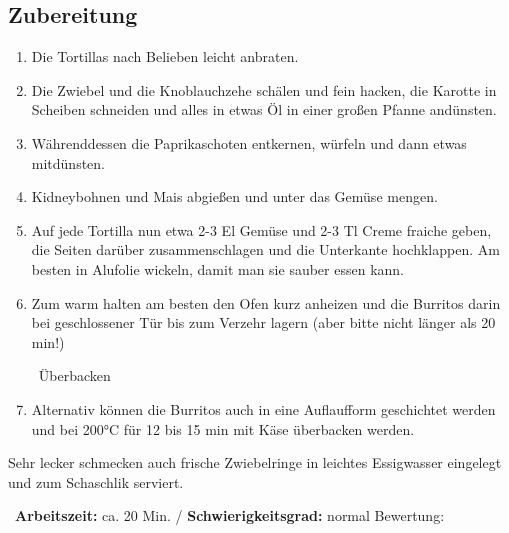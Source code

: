 \begin{minipage}[t]{0.58\textwidth}
\vspace{0pt}
\subsection*{Zubereitung}
\begin{enumerate}[leftmargin=*, itemindent=14pt]

    \item Die Tortillas nach Belieben leicht anbraten.

    \item Die Zwiebel und die Knoblauchzehe schälen und fein hacken, die Karotte in Scheiben schneiden und alles in etwas Öl in einer großen Pfanne andünsten.

    \item Währenddessen die Paprikaschoten entkernen, würfeln und dann etwas mitdünsten.

    \item Kidneybohnen und Mais abgießen und unter das Gemüse mengen.

    \item Auf jede Tortilla nun etwa 2-3 El Gemüse und 2-3 Tl Creme fraiche geben, die Seiten darüber zusammenschlagen und die Unterkante hochklappen. Am besten in Alufolie wickeln, damit man sie sauber essen kann.

    \item Zum warm halten am besten den Ofen kurz anheizen und die Burritos darin bei geschlossener Tür bis zum Verzehr lagern (aber bitte nicht länger als 20 min!)


    \leafNE\, Überbacken

    \item Alternativ können die Burritos auch in eine Auflaufform geschichtet werden und bei 200°C für 12 bis 15 min mit Käse überbacken werden. 

\end{enumerate}
Sehr lecker schmecken auch frische Zwiebelringe in leichtes Essigwasser eingelegt und zum Schaschlik serviert.
\end{minipage}
\vfill
\decothreeright \, \textbf{Arbeitszeit:} ca. 20 Min. / \textbf{Schwierigkeitsgrad:} normal \decothreeleft \hfill Bewertung: \CIRCLE \CIRCLE \CIRCLE \CIRCLE \LEFTcircle 